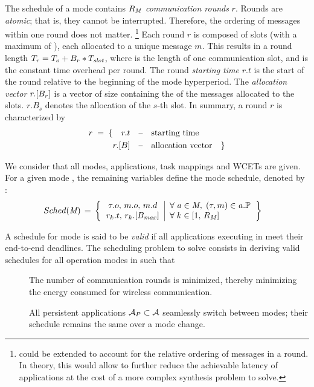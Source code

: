 The schedule of a mode \mode{} contains $R_{\mathit{M_{}}}$ \emph{communication rounds} $r$.
Rounds are \emph{atomic}; that is, they cannot be interrupted. Therefore, the ordering of messages within one round does not matter.%
%
\footnote{\TTW could be extended to account for the relative ordering of messages in a round. In theory, this would allow to further reduce the achievable latency of applications at the cost of a more complex synthesis problem to solve.}
%
Each round $r$ is composed of \nslotsround slots (with a maximum of \nslotsmax), each allocated to a unique message $m$.
This results in a round length $T_{r} = T_{o} + B_r*T_{\mathit{slot}}$, where \Tslot is the length of one communication slot, and \Toffset is the constant time overhead per round.
The round \emph{starting time} $r.t$ is the start of the round relative to the beginning of the mode hyperperiod.
The \emph{allocation vector} $r.[B_r]$ is a vector of size \nslotsround containing the \ids of the messages allocated to the slots. $r.B_s$ denotes the allocation of the $s$-th slot.
In summary, a round $r$ is characterized by
\begin{align*}
r \; = \; \{ \quad
	 r.t
	\quad &\text{--\quad starting time} \\
	 r.[B]
	\quad &\text{--\quad allocation vector}  \quad \}
\end{align*}


We consider that all modes, applications, task mappings and WCETs are given. For a given mode \mode{}, the remaining variables define the mode schedule, denoted by \sched{\mode{}}:
\begin{align*}
&\sched{\mode{}} \, = \,
	\left\lbrace
	\begin{tabular}{c|l}
	$\tau.o, \, m.o, \, m.d$
	&
	$\forall \; \app \in \mode{}, \;
	(\tau,m) \in \app.\predG$
	\\
	$r_k.t, \, r_k.[\nslotsmax]$
	&
	$\forall \; k \in [1, \, R_{\mode{}}]$
	\end{tabular}
	\right\rbrace
\end{align*}

A schedule for mode \modeany is said to be \emph{valid} if all applications executing in \modeany meet their end-to-end deadlines.
The scheduling problem to solve consists in deriving valid schedules for all operation modes in \modeset such that
\begin{description}
	\item []
	The number of communication rounds is minimized, thereby minimizing the energy consumed for wireless communication.
	\item []
	All persistent applications $\mathcal{A}_{P} \subset \mathcal{A}$ seamlessly switch between modes; \ie their schedule remains the same over a mode change.
\end{description}

